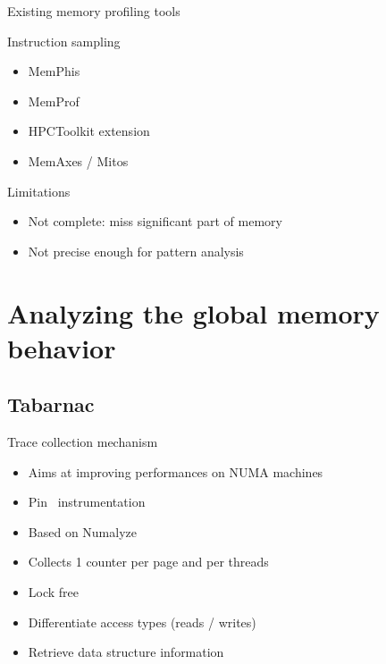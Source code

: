 \documentclass[xcolor={usenames,dvipsnames},hyperref={pdfusetitle}]{beamer}
\begin{document}
\begin{frame}{Existing memory profiling tools}
    \begin{block}{Instruction sampling~\cite{Drongowski07Instructionbased,Levinthal09Performance}}
        \begin{itemize}
            \item  MemPhis~\cite{McCurdy10Memphis}
            \item  MemProf~\cite{Lachaize12MemProf}
            \item  HPCToolkit extension~\cite{Liu14Tool}
            \item  MemAxes / Mitos~\cite{Gimenez14Dissecting}
        \end{itemize}
    \end{block}
    \pause 
    \begin{alertblock}{Limitations}
        \begin{itemize}
            \item Not complete: miss significant part of memory
            \item Not precise enough for pattern analysis
        \end{itemize}
    \end{alertblock}
\end{frame}

\section{Analyzing the global memory behavior}

\subsection{Tabarnac}

\begin{frame}{Trace collection mechanism}
    \begin{itemize}[<+-|alert@+>]
        \item Aims at improving performances on NUMA machines
        \item Pin~\cite{Luk05Pin} instrumentation
        \item Based on Numalyze~\cite{Diener15Characterizing}
        \item Collects 1 counter per page and per threads
        \item Lock free
        \item Differentiate access types (reads / writes)
        \item Retrieve data structure information
    \end{itemize}
\end{frame}
\end{document}
